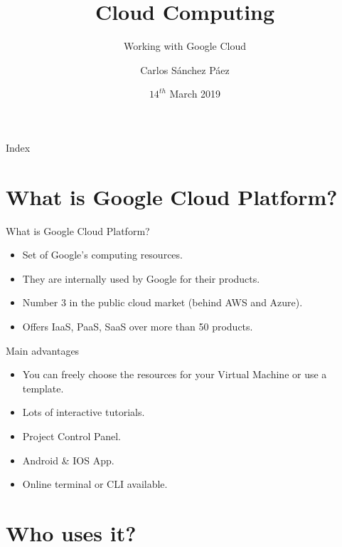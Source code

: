 \documentclass{beamer}
\title{Cloud Computing}
\date{$14^{th}$ March 2019}
\subtitle{Working with Google Cloud}
\author{Carlos Sánchez Páez}
\begin{document}
\centering
\begin{frame}
 \titlepage
\end{frame}

\begin{frame}{Index}
 \tableofcontents
\end{frame}

\section{What is Google Cloud Platform?}

\begin{frame}[fragile]{What is Google Cloud Platform?}
  \begin{itemize}[<+->]
    \item Set of Google's computing resources.
    \item They are internally used by Google for their products.
    \item Number 3 in the public cloud market (behind AWS and Azure).
    \item Offers IaaS, PaaS, SaaS over more than 50 products.
  \end{itemize}
\end{frame}


\begin{frame}[fragile]{Main advantages}
  \begin{itemize}[<+->]
    \item You can freely choose the resources for your Virtual Machine or use a template.
    \item Lots of interactive tutorials.
    \item Project Control Panel.
    \item Android \& IOS App.
    \item Online terminal or CLI available.
  \end{itemize}
\end{frame}

\section{Who uses it?}
\end{document}
